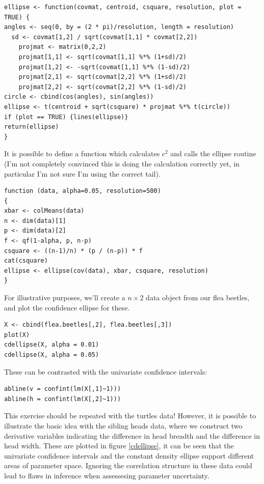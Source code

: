 \singlespacing
\begin{verbatim}
ellipse <- function(covmat, centroid, csquare, resolution, plot = TRUE) {
angles <- seq(0, by = (2 * pi)/resolution, length = resolution)
  sd <- covmat[1,2] / sqrt(covmat[1,1] * covmat[2,2])
    projmat <- matrix(0,2,2)
    projmat[1,1] <- sqrt(covmat[1,1] %*% (1+sd)/2)
    projmat[1,2] <- -sqrt(covmat[1,1] %*% (1-sd)/2)
    projmat[2,1] <- sqrt(covmat[2,2] %*% (1+sd)/2)
    projmat[2,2] <- sqrt(covmat[2,2] %*% (1-sd)/2)
circle <- cbind(cos(angles), sin(angles))
ellipse <- t(centroid + sqrt(csquare) * projmat %*% t(circle))
if (plot == TRUE) {lines(ellipse)}
return(ellipse)
}
\end{verbatim}
\onehalfspacing

It is possible to define a function which calculates $c^{2}$ and calls the ellipse routine (I'm not completely convinced this is doing the calculation correctly yet, in particular I'm not sure I'm using the correct tail).

\singlespacing
\begin{verbatim}
function (data, alpha=0.05, resolution=500) 
{
xbar <- colMeans(data)
n <- dim(data)[1]
p <- dim(data)[2]
f <- qf(1-alpha, p, n-p)
csquare <- ((n-1)/n) * (p / (n-p)) * f
cat(csquare) 
ellipse <- ellipse(cov(data), xbar, csquare, resolution)
}
\end{verbatim}
\onehalfspacing




For illustrative purposes, we'll create a $n \times 2$ data object from our flea beetles, and plot the confidence ellipse for these.

\singlespacing
\begin{verbatim}
X <- cbind(flea.beetles[,2], flea.beetles[,3])
plot(X)
cdellipse(X, alpha = 0.01)
cdellipse(X, alpha = 0.05)
\end{verbatim}
\onehalfspacing


These can be contrasted with the univariate confidence intervals:

\singlespacing
\begin{verbatim}
abline(v = confint(lm(X[,1]~1)))
abline(h = confint(lm(X[,2]~1)))
\end{verbatim}
\onehalfspacing

This exercise should be repeated with the turtles data!   However, it is possible to illustrate the basic idea with the sibling heads data, where we construct two derivative variables indicating the difference in head breadth and the difference in head width.   These are plotted in figure \ref{cdellipse}, it can be seen that the univariate confidence intervals and the constant density ellipse support different areas of parameter space.   Ignoring the correlation structure in these data could lead to flaws in inference when assessesing parameter uncertainty.

